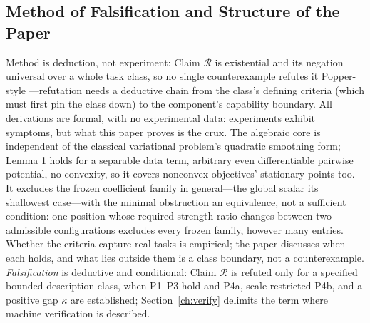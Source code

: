 \subsection{Method of Falsification and Structure of the Paper}

Method is deduction, not experiment: Claim $\mathcal{R}$ is existential and its negation universal over a whole task class, so no single counterexample refutes it Popper-style \citep{popper1959}---refutation needs a deductive chain from the class's defining criteria (which must first pin the class down) to the component's capability boundary. All derivations are formal, with no experimental data: experiments exhibit symptoms, but what this paper proves is the crux. The algebraic core is independent of the classical variational problem's quadratic smoothing form; Lemma 1 holds for a separable data term, arbitrary even differentiable pairwise potential, no convexity, so it covers nonconvex objectives' stationary points too. It excludes the frozen coefficient family in general---the global scalar its shallowest case---with the minimal obstruction an equivalence, not a sufficient condition: one position whose required strength ratio changes between two admissible configurations excludes every frozen family, however many entries. Whether the criteria capture real tasks is empirical; the paper discusses when each holds, and what lies outside them is a class boundary, not a counterexample. \emph{Falsification} is deductive and conditional: Claim $\mathcal{R}$ is refuted only for a specified bounded-description class, when P1--P3 hold and P4a, scale-restricted P4b, and a positive gap $\kappa$ are established; Section~\ref{ch:verify} delimits the term where machine verification is described.
